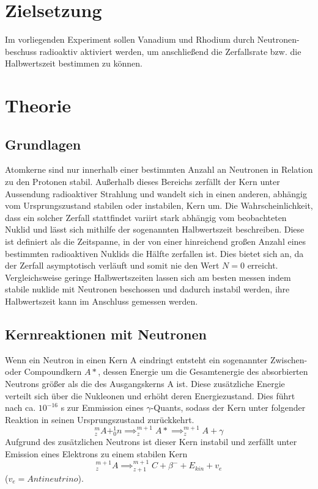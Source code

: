 \section{Zielsetzung}
\label{sec:zielsetzung}
Im vorliegenden Experiment sollen Vanadium und Rhodium durch Neutronen-beschuss radioaktiv aktiviert werden, um anschließend 
die Zerfallsrate bzw. die Halbwertszeit bestimmen zu können.
\section{Theorie}
\label{sec:theorie}
\subsection{Grundlagen}
Atomkerne sind nur innerhalb einer bestimmten Anzahl an Neutronen in Relation zu den Protonen stabil. 
Außerhalb dieses Bereichs zerfällt der Kern unter Aussendung radioaktiver Strahlung und wandelt sich in 
einen anderen, abhängig vom Ursprungszustand stabilen oder instabilen, Kern um. Die Wahrscheinlichkeit, 
dass ein solcher Zerfall stattfindet variirt stark abhängig vom beobachteten Nuklid und lässt sich mithilfe 
der sogenannten Halbwertszeit beschreiben. Diese ist definiert als die Zeitspanne, in der von einer 
hinreichend großen Anzahl eines bestimmten radioaktiven Nuklids die Hälfte zerfallen ist. Dies bietet 
sich an, da der Zerfall asymptotisch verläuft und somit nie den Wert $N=0$ erreicht. Vergleichsweise 
geringe Halbwertszeiten lassen sich am besten messen indem stabile nuklide mit Neutronen beschossen und 
dadurch instabil werden, ihre Halbwertszeit kann im Anschluss gemessen werden.
\subsection{Kernreaktionen mit Neutronen}
Wenn ein Neutron in einen Kern A eindringt entsteht ein sogenannter Zwischen- oder Compoundkern $A*$, dessen 
Energie um die Gesamtenergie des absorbierten Neutrons größer als die des Ausgangskerns A ist.  Diese 
zusätzliche Energie verteilt sich über die Nukleonen und erhöht deren Energiezustand. Dies führt nach ca. 
$10^{-16}$ s zur Emmission eines $\gamma$-Quants, sodass der Kern unter folgender Reaktion in seinen 
Ursprungszustand zurückkehrt.
\begin{equation*}
^m_zA + ^1_0n \implies ^{m+1}_zA* \implies ^{m+1}_z A+ \gamma
\end{equation*}
Aufgrund des zusätzlichen Neutrons ist dieser Kern instabil und zerfällt unter Emission eines 
Elektrons zu einem stabilen Kern
\begin{equation*}
^{m+1}_z A \implies  ^{m+1}_{z+1} C + \beta^- + E_{kin} + v_e
\end{equation*}
($v_e = Antineutrino$).
